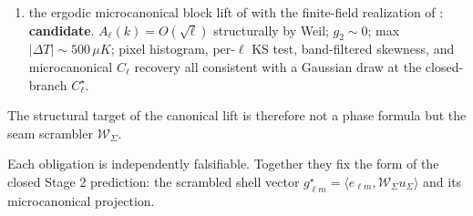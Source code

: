 \begin{remark}
\begin{enumerate}[label=(O\arabic*),leftmargin=2.4em,topsep=3pt,itemsep=2pt]
\begin{enumerate}[label=(\alph*),leftmargin=2em,topsep=2pt,itemsep=1pt]
\item the ergodic microcanonical block lift of  with the
finite-field realization of : \textbf{candidate}.
$A_\ell(k)=O(\sqrt{\ell})$ structurally by Weil; $g_2\sim 0$; max $|\Delta T|\sim 500\,\mu K$;
pixel histogram, per-$\ell$ KS test, band-filtered skewness, and microcanonical $C_\ell$ recovery
all consistent with a Gaussian draw at the closed-branch $C_\ell^\star$.
\end{enumerate}
The structural target of the canonical lift is therefore not a phase formula but the seam
scrambler $\mathcal W_\Sigma$.
\end{enumerate}
Each obligation is independently falsifiable. Together they fix the form of the closed Stage 2
prediction: the scrambled shell vector
\(g_{\ell m}^{\star}=\langle e_{\ell m},\mathcal W_\Sigma u_\Sigma\rangle\)
and its microcanonical projection.
\end{remark}

